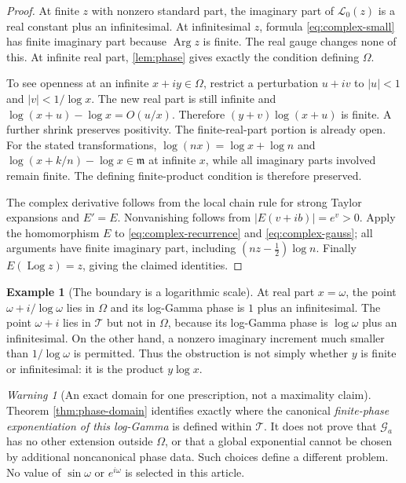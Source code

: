 \documentclass[11pt,letterpaper]{article}
\numberwithin{equation}{section}
\theoremstyle{plain}
\theoremstyle{definition}
\newtheorem{example}[example]{Example}
\theoremstyle{remark}
\newtheorem{warning}[warning]{Warning}
\newcommand{\mi}{\mathfrak m}
\newcommand{\Log}{\operatorname{Log}}
\newcommand{\abs}[1]{\lvert#1\rvert}
\newcommand{\tube}{\mathcal T}
\newcommand{\Lt}{\mathcal L}
\newcommand{\Gt}{\mathcal G}
\begin{document}
\begin{proof}
At finite $z$ with nonzero standard part, the imaginary part of $\Lt_0(z)$
is a real constant plus an infinitesimal. At infinitesimal $z$, formula
\eqref{eq:complex-small} has finite imaginary part because $\operatorname{Arg}z$
is finite. The real gauge changes none of this. At infinite real part,
\cref{lem:phase} gives exactly the condition defining $\Omega$.

To see openness at an infinite $x+iy\in\Omega$, restrict a perturbation
$u+iv$ to $\abs u<1$ and $\abs v<1/\log x$. The new real part is still
infinite and
$\log(x+u)-\log x=O(u/x)$. Therefore
$(y+v)\log(x+u)$ is finite. A further shrink preserves positivity.
The finite-real-part portion is already open. For the stated transformations,
$\log(nx)=\log x+\log n$ and
$\log(x+k/n)-\log x\in\mi$ at infinite $x$, while all imaginary
parts involved remain finite. The defining finite-product condition is
therefore preserved.

The complex derivative follows from the local chain rule for strong Taylor
expansions and $E'=E$. Nonvanishing follows from
$\abs{E(v+ib)}=e^v>0$. Apply the homomorphism $E$ to
\eqref{eq:complex-recurrence} and \eqref{eq:complex-gauss}; all arguments
have finite imaginary part, including $(nz-\tfrac12)\log n$.
Finally $E(\Log z)=z$, giving the claimed identities.
\end{proof}

\begin{example}[The boundary is a logarithmic scale]
At real part $x=\omega$, the point
$\omega+i/\log\omega$ lies in $\Omega$ and its log-Gamma phase is
$1$ plus an infinitesimal. The point $\omega+i$ lies in $\tube$ but not
in $\Omega$, because its log-Gamma phase is $\log\omega$ plus an
infinitesimal. On the other hand, a nonzero imaginary increment much smaller
than $1/\log\omega$ is permitted. Thus the obstruction is not simply
whether $y$ is finite or infinitesimal: it is the product $y\log x$.
\end{example}

\begin{warning}[An exact domain for one prescription, not a maximality claim]
Theorem \ref{thm:phase-domain} identifies exactly where the canonical
\emph{finite-phase exponentiation of this log-Gamma} is defined within
$\tube$. It does not prove that $\Gt_a$ has no other extension outside
$\Omega$, or that a global exponential cannot be chosen by additional
noncanonical phase data. Such choices define a different problem. No
value of $\sin\omega$ or $e^{i\omega}$ is selected in this article.
\end{warning}
\end{document}
